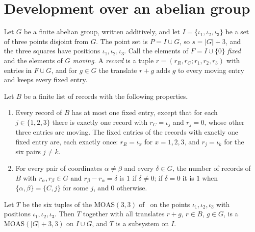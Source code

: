 \documentclass[11pt]{amsart}
\theoremstyle{definition}\newtheorem{definition}[theorem]{Definition}
\theoremstyle{remark}\newtheorem{remark}[theorem]{Remark}
\newcommand{\MOAS}{\mathrm{MOAS}}
\begin{document}
\section{Development over an abelian group}\label{sec:dev}
Let $G$ be a finite abelian group, written additively, and let $I=\{\iota_1,\iota_2,\iota_3\}$ be a set of three
points disjoint from $G$. The point set is $P=I\cup G$, so $s=|G|+3$, and the three squares have positions
$\iota_1,\iota_2,\iota_3$. Call the elements of $F=I\cup\{0\}$ \emph{fixed} and the elements of $G$ \emph{moving}. A
\emph{record} is a tuple $r=(r_R,r_C;r_1,r_2,r_3)$ with entries in $F\cup G$, and for $g\in G$ the translate
$r+g$ adds $g$ to every moving entry and keeps every fixed entry.

\begin{lemma}\label{lem:dev}
Let $B$ be a finite list of records with the following properties.
\begin{enumerate}
\item[(F)] Every record of $B$ has at most one fixed entry, except that for each $j\in\{1,2,3\}$ there is exactly one
record with $r_C=\iota_j$ and $r_j=0$, whose other three entries are moving. The fixed entries of the records with
exactly one fixed entry are, each exactly once: $r_R=\iota_x$ for $x=1,2,3$, and $r_j=\iota_k$ for the six pairs $j\ne k$.
\item[(D)] For every pair of coordinates $\alpha\ne\beta$ and every $\delta\in G$, the number of records of $B$ with
$r_\alpha,r_\beta\in G$ and $r_\beta-r_\alpha=\delta$ is $1$ if $\delta\ne0$; if $\delta=0$ it is $1$ when
$\{\alpha,\beta\}=\{C,j\}$ for some $j$, and $0$ otherwise.
\end{enumerate}
Let $T$ be the six tuples of the $\MOAS(3,3)$ of~\cite[Example~2.18]{ABW} on the points $\iota_1,\iota_2,\iota_3$ with
positions $\iota_1,\iota_2,\iota_3$. Then $T$ together with all translates $r+g$, $r\in B$, $g\in G$, is a
$\MOAS(|G|+3,3)$ on $I\cup G$, and $T$ is a subsystem on $I$.
\end{lemma}
\end{document}
